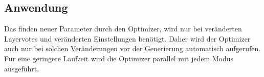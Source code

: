 \subsection{Anwendung}
Das finden neuer Parameter durch den Optimizer, wird nur bei veränderten Layervotes und veränderten Einstellungen benötigt.
Daher wird der Optimizer auch nur bei solchen Veränderungen vor der Generierung automatisch aufgerufen. 
Für eine geringere Laufzeit wird die Optimizer parallel mit jedem Modus ausgeführt.
